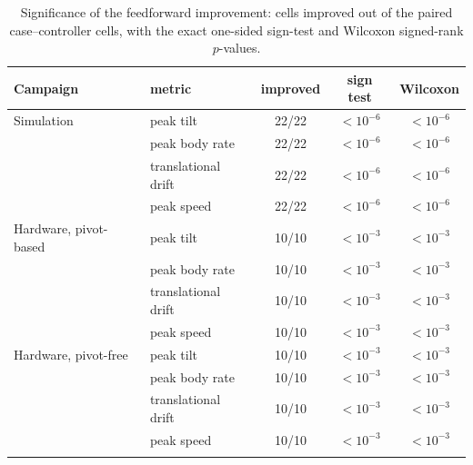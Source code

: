 \begin{table}[t]
\caption{Significance of the feedforward improvement:
cells improved out of the paired case--controller cells,
with the exact one-sided sign-test and Wilcoxon
signed-rank $p$-values.}
\label{tab:ff_significance}
\centering\small
\begin{tabular}{@{}llccc@{}}
\toprule
Campaign & metric & improved & sign test & Wilcoxon\\
\midrule
Simulation & peak tilt & 22/22 & $<10^{-6}$ & $<10^{-6}$\\
 & peak body rate & 22/22 & $<10^{-6}$ & $<10^{-6}$\\
 & translational drift & 22/22 & $<10^{-6}$ & $<10^{-6}$\\
 & peak speed & 22/22 & $<10^{-6}$ & $<10^{-6}$\\
\addlinespace
Hardware, pivot-based & peak tilt & 10/10 & $<10^{-3}$ & $<10^{-3}$\\
 & peak body rate & 10/10 & $<10^{-3}$ & $<10^{-3}$\\
 & translational drift & 10/10 & $<10^{-3}$ & $<10^{-3}$\\
 & peak speed & 10/10 & $<10^{-3}$ & $<10^{-3}$\\
\addlinespace
Hardware, pivot-free & peak tilt & 10/10 & $<10^{-3}$ & $<10^{-3}$\\
 & peak body rate & 10/10 & $<10^{-3}$ & $<10^{-3}$\\
 & translational drift & 10/10 & $<10^{-3}$ & $<10^{-3}$\\
 & peak speed & 10/10 & $<10^{-3}$ & $<10^{-3}$\\
\addlinespace
\bottomrule
\end{tabular}
\end{table}
